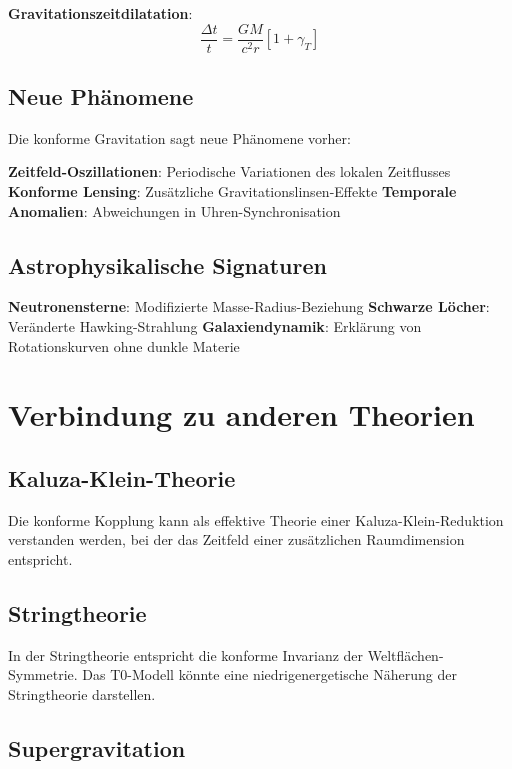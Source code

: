 \documentclass[12pt,a4paper]{report}
\begin{document}
	\textbf{Gravitationszeitdilatation}:
	\begin{equation}
		\frac{\Delta t}{t} = \frac{GM}{c^2 r} \left[1 + \gamma_T\right]
	\end{equation}
	
	\subsection{Neue Phänomene}
	
	Die konforme Gravitation sagt neue Phänomene vorher:
	
	\textbf{Zeitfeld-Oszillationen}: Periodische Variationen des lokalen Zeitflusses
	\textbf{Konforme Lensing}: Zusätzliche Gravitationslinsen-Effekte
	\textbf{Temporale Anomalien}: Abweichungen in Uhren-Synchronisation
	
	\subsection{Astrophysikalische Signaturen}
	
	\textbf{Neutronensterne}: Modifizierte Masse-Radius-Beziehung
	\textbf{Schwarze Löcher}: Veränderte Hawking-Strahlung
	\textbf{Galaxiendynamik}: Erklärung von Rotationskurven ohne dunkle Materie
	
	\section{Verbindung zu anderen Theorien}
	
	\subsection{Kaluza-Klein-Theorie}
	
	Die konforme Kopplung kann als effektive Theorie einer Kaluza-Klein-Reduktion verstanden werden, bei der das Zeitfeld einer zusätzlichen Raumdimension entspricht.
	
	\subsection{Stringtheorie}
	
	In der Stringtheorie entspricht die konforme Invarianz der Weltflächen-Symmetrie. Das T0-Modell könnte eine niedrigenergetische Näherung der Stringtheorie darstellen.
	
	\subsection{Supergravitation}
	
\end{document}
